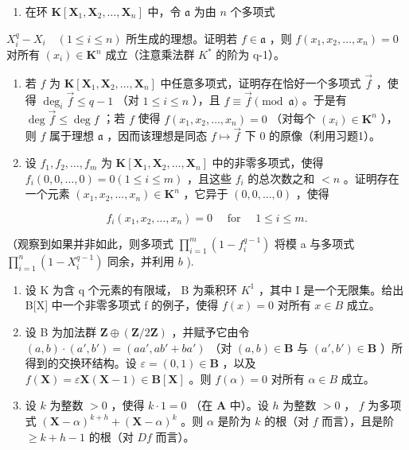 \begin{enumerate}
\def\labelenumi{\alph{enumi})}
\tightlist
\item
  在环 \(\mathbf{K}[\mathbf{X}_1, \mathbf{X}_2, \ldots, \mathbf{X}_n]\) 中，令 \(\mathfrak{a}\) 为由 \(n\) 个多项式
\end{enumerate}

\(X_{i}^{q}-X_{i}\quad(1\leqslant i\leqslant n)\) 所生成的理想。证明若 \(f\in\mathfrak{a}\) ，则 \(f(x_{1},x_{2},\ldots,x_{n})=0\) 对所有 \((x_{i})\in\mathbf{K}^{n}\) 成立（注意乘法群 \(K^{*}\) 的阶为 q-1）。

\begin{enumerate}
\def\labelenumi{\alph{enumi})}
\setcounter{enumi}{1}
\item
  若 \(f\) 为 \(\mathbf{K}[\mathbf{X}_1, \mathbf{X}_2, \ldots, \mathbf{X}_n]\) 中任意多项式，证明存在恰好一个多项式 \(\vec{f}\) ，使得 \(\deg_i \vec{f} \leqslant q - 1\) （对 \(1 \leqslant i \leqslant n\) ），且 \(f \equiv \vec{f} \pmod{\mathfrak{a}}\) 。于是有 \(\deg \vec{f} \leqslant \deg f\) ；若 \(f\) 使得 \(f(x_1, x_2, \ldots, x_n) = 0\) （对每个 \((x_i) \in \mathbf{K}^n\) ），则 \(f\) 属于理想 \(\mathfrak{a}\) ，因而该理想是同态 \(f \mapsto \vec{f}\) 下 0 的原像（利用习题1）。
\item
  设 \(f_1, f_2, \ldots, f_m\) 为 \(\mathbf{K}[\mathbf{X}_1, \mathbf{X}_2, \ldots, \mathbf{X}_n]\) 中的非零多项式，使得 \(f_i(0, 0, \ldots, 0) = 0 (1 \leqslant i \leqslant m)\) ，且这些 \(f_i\) 的总次数之和 \(< n\) 。证明存在一个元素 \((x_1, x_2, \ldots, x_n) \in \mathbf{K}^n\) ，它异于 \((0, 0, \ldots, 0)\) ，使得
\end{enumerate}

\[
f _ {i} (x _ {1}, x _ {2}, \dots , x _ {n}) = 0 \quad \text { for } \quad 1 \leqslant i \leqslant m.
\]

（观察到如果并非如此，则多项式 \(\prod_{i=1}^{m} (1 - f_i^{q-1})\) 将模 a 与多项式 \(\prod_{i=1}^{n} (1 - X_i^{q-1})\) 同余，并利用 \(b\) ).

\begin{enumerate}
\def\labelenumi{\arabic{enumi})}
\setcounter{enumi}{6}
\item
  设 K 为含 q 个元素的有限域， B 为乘积环 \(K^{1}\) ，其中 I 是一个无限集。给出 B{[}X{]} 中一个非零多项式 f 的例子，使得 \(f(x)=0\) 对所有 \(x\in B\) 成立。
\item
  设 B 为加法群 \(\mathbf{Z} \oplus (\mathbf{Z}/2\mathbf{Z})\) ，并赋予它由令 \((a, b) \cdot (a', b') = (aa', ab' + ba')\) （对 \((a, b) \in \mathbf{B}\) 与 \((a', b') \in \mathbf{B}\) ）所得到的交换环结构。设 \(\varepsilon = (0, 1) \in \mathbf{B}\) ，以及 \(f(\mathbf{X}) = \varepsilon \mathbf{X}(\mathbf{X} - 1) \in \mathbf{B}[\mathbf{X}]\) 。则 \(f(\alpha) = 0\) 对所有 \(\alpha \in B\) 成立。
\item
  设 \(k\) 为整数 \(> 0\) ，使得 \(k \cdot 1 = 0\) （在 \(\mathbf{A}\) 中）。设 \(h\) 为整数 \(> 0\) ， \(f\) 为多项式 \((\mathbf{X} - \alpha)^{k + h} + (\mathbf{X} - \alpha)^k\) 。则 \(\alpha\) 是阶为 \(k\) 的根（对 \(f\) 而言），且是阶 \(\geqslant k + h - 1\) 的根（对 \(Df\) 而言）。
\end{enumerate}

